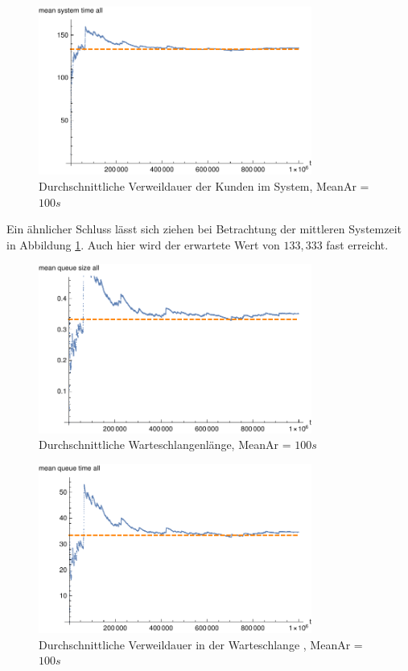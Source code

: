 \begin{figure}[htpb]
	\centering
	\includegraphics[width=0.8\textwidth]{abbildungen/2_Phone_VIP/Arrival_100_Serve_100_dur_1000000_Skip_0/MeanSystemTimeAll.pdf}
	\caption{Durchschnittliche Verweildauer der Kunden im System, MeanAr = $100s$}
	\label{fig:mean3SystemTime100}
\end{figure}

Ein ähnlicher Schluss lässt sich ziehen bei Betrachtung der mittleren Systemzeit in Abbildung \ref{fig:mean3SystemTime100}. Auch hier wird der erwartete Wert von $133,333$ fast erreicht.

\begin{figure}[htpb]
	\centering
	\includegraphics[width=0.8\textwidth]{abbildungen/2_Phone_VIP/Arrival_100_Serve_100_dur_1000000_Skip_0/MeanQueueSizeAll.pdf}
	\caption{Durchschnittliche Warteschlangenlänge, MeanAr = $100s$}
	\label{fig:mean3QueueSize100}
\end{figure}

\begin{figure}[htpb]
	\centering
	\includegraphics[width=0.8\textwidth]{abbildungen/2_Phone_VIP/Arrival_100_Serve_100_dur_1000000_Skip_0/MeanQueueTimeAll.pdf}
	\caption{Durchschnittliche Verweildauer in der Warteschlange , MeanAr = $100s$}
	\label{fig:mean3QueueTime100}
\end{figure} 

